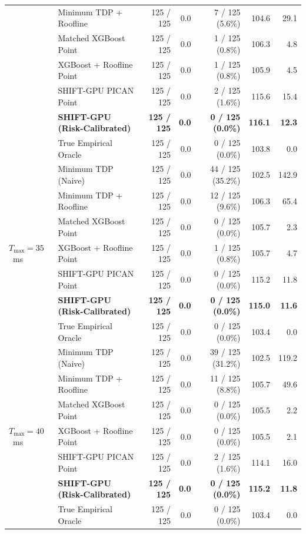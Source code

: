 \documentclass[preprint,12pt]{elsarticle}
\begin{document}
\begin{table}[h]
{\begin{tabular}{llrrrrr}
& Minimum TDP + Roofline & 125 / 125 & 0.0 & 7 / 125 (5.6\%) & 104.6 & 29.1 \\
& Matched XGBoost Point & 125 / 125 & 0.0 & 1 / 125 (0.8\%) & 106.3 & 4.8 \\
& XGBoost + Roofline Point & 125 / 125 & 0.0 & 1 / 125 (0.8\%) & 105.9 & 4.5 \\
& SHIFT-GPU PICAN Point & 125 / 125 & 0.0 & 2 / 125 (1.6\%) & 115.6 & 15.4 \\
& \textbf{SHIFT-GPU (Risk-Calibrated)} & \textbf{125 / 125} & \textbf{0.0} & \textbf{0 / 125 (0.0\%)} & \textbf{116.1} & \textbf{12.3} \\
& True Empirical Oracle & 125 / 125 & 0.0 & 0 / 125 (0.0\%) & 103.8 & 0.0 \\
\midrule
\multirow{7}{*}{$T_{\max} = 35$~ms} 
& Minimum TDP (Naive) & 125 / 125 & 0.0 & 44 / 125 (35.2\%) & 102.5 & 142.9 \\
& Minimum TDP + Roofline & 125 / 125 & 0.0 & 12 / 125 (9.6\%) & 106.3 & 65.4 \\
& Matched XGBoost Point & 125 / 125 & 0.0 & 0 / 125 (0.0\%) & 105.7 & 2.3 \\
& XGBoost + Roofline Point & 125 / 125 & 0.0 & 1 / 125 (0.8\%) & 105.7 & 4.7 \\
& SHIFT-GPU PICAN Point & 125 / 125 & 0.0 & 0 / 125 (0.0\%) & 115.2 & 11.8 \\
& \textbf{SHIFT-GPU (Risk-Calibrated)} & \textbf{125 / 125} & \textbf{0.0} & \textbf{0 / 125 (0.0\%)} & \textbf{115.0} & \textbf{11.6} \\
& True Empirical Oracle & 125 / 125 & 0.0 & 0 / 125 (0.0\%) & 103.4 & 0.0 \\
\midrule
\multirow{7}{*}{$T_{\max} = 40$~ms} 
& Minimum TDP (Naive) & 125 / 125 & 0.0 & 39 / 125 (31.2\%) & 102.5 & 119.2 \\
& Minimum TDP + Roofline & 125 / 125 & 0.0 & 11 / 125 (8.8\%) & 105.7 & 49.6 \\
& Matched XGBoost Point & 125 / 125 & 0.0 & 0 / 125 (0.0\%) & 105.5 & 2.2 \\
& XGBoost + Roofline Point & 125 / 125 & 0.0 & 0 / 125 (0.0\%) & 105.5 & 2.1 \\
& SHIFT-GPU PICAN Point & 125 / 125 & 0.0 & 2 / 125 (1.6\%) & 114.1 & 16.0 \\
& \textbf{SHIFT-GPU (Risk-Calibrated)} & \textbf{125 / 125} & \textbf{0.0} & \textbf{0 / 125 (0.0\%)} & \textbf{115.2} & \textbf{11.8} \\
& True Empirical Oracle & 125 / 125 & 0.0 & 0 / 125 (0.0\%) & 103.4 & 0.0 \\
\bottomrule
\end{tabular}%
}
\end{table}
\end{document}
